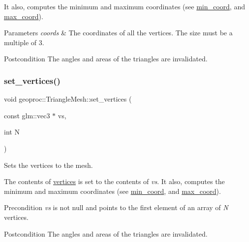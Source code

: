 It also, computes the minimum and maximum coordinates (see \hyperlink{classgeoproc_1_1TriangleMesh_aab5e7d8baf6f6cd7b5655b4c89f79e00}{min\+\_\+coord}, and \hyperlink{classgeoproc_1_1TriangleMesh_acffb17b164f0428aa01316b0a08bc2a3}{max\+\_\+coord}). 
\begin{DoxyParams}{Parameters}
{\em coords} & The coordinates of all the vertices. The size must be a multiple of 3.\\
\hline
\end{DoxyParams}
\begin{DoxyPostcond}{Postcondition}
The angles and areas of the triangles are invalidated. 
\end{DoxyPostcond}
\mbox{\label{classgeoproc_1_1TriangleMesh_a09b76789e908062501de253d360e0236}} 
\subsubsection{\texorpdfstring{set\+\_\+vertices()}{set\_vertices()}\hspace{0.1cm}{\footnotesize\ttfamily [2/3]}}
{\footnotesize\ttfamily void geoproc\+::\+Triangle\+Mesh\+::set\+\_\+vertices (\begin{DoxyParamCaption}\item[{const glm\+::vec3 $\ast$}]{vs,  }\item[{int}]{N }\end{DoxyParamCaption})}



Sets the vertices to the mesh. 

The contents of \hyperlink{classgeoproc_1_1TriangleMesh_a82c3351de37daa9440f53597f080992d}{vertices} is set to the contents of {\itshape vs}. It also, computes the minimum and maximum coordinates (see \hyperlink{classgeoproc_1_1TriangleMesh_aab5e7d8baf6f6cd7b5655b4c89f79e00}{min\+\_\+coord}, and \hyperlink{classgeoproc_1_1TriangleMesh_acffb17b164f0428aa01316b0a08bc2a3}{max\+\_\+coord}). \begin{DoxyPrecond}{Precondition}
{\itshape vs} is not null and points to the first element of an array of {\itshape N} vertices.
\end{DoxyPrecond}
\begin{DoxyPostcond}{Postcondition}
The angles and areas of the triangles are invalidated. 
\end{DoxyPostcond}
\mbox{\label{classgeoproc_1_1TriangleMesh_a2bd9a343db1642d11b39b6fab5710d3a}} 
